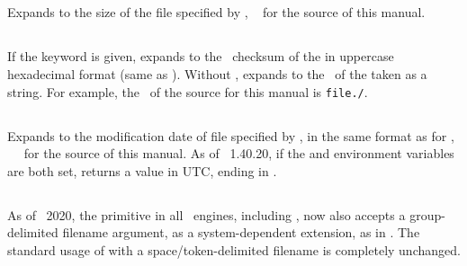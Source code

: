 \documentclass{pdftexmanual}
\begin{document}
\subsection{}

Expands to the size of the file specified by ,
\eg\ {\tt {}} for the source of this manual.

\subsection{}

If the keyword  is given, expands to the \MDFIVE\ checksum of
the  in uppercase hexadecimal format (same as
). Without , expands to the \MDFIVE\ of the
 taken as a string. For example, the \MDFIVE\ of
the source for this manual is {\tt \pdfmdfivesum file{./\jobname}}.

\subsection{}

Expands to the modification date of file specified by , in the same format as for , \eg\ {\tt
{}} for the source of this manual. As of
\PDFTEX\ 1.40.20, if the  and
 environment variables are both set,
 returns a value in UTC, ending in .

\subsection{}

As of \TEXLIVE\ 2020, the  primitive in all \TEX\ engines,
including \PDFTEX, now also accepts a group-delimited filename argument,
as a system-dependent extension, as in
\Lbrace{}\Rbrace. The standard usage of 
with a space/token-delimited filename is completely unchanged.
\end{document}
